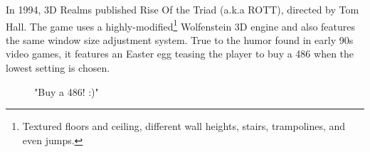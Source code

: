    \begin{figure}[H]
\centering
 \end{figure}
 \par

   \begin{figure}[H]
\centering
 \end{figure}
 \par
{} In 1994, 3D Realms published Rise Of the Triad (a.k.a ROTT), directed by Tom Hall. The game uses a highly-modified\footnote{Textured floors and ceiling, different wall heights, stairs, trampolines, and even jumps.} Wolfenstein 3D engine and also features the same window size adjustment system. True to the humor found in early 90s video games, it features an Easter egg teasing the player to buy a 486 when the lowest setting is chosen.
    \begin{figure}[H]
\centering
 \caption{"Buy a 486! :)"}
 \end{figure}
 \par
